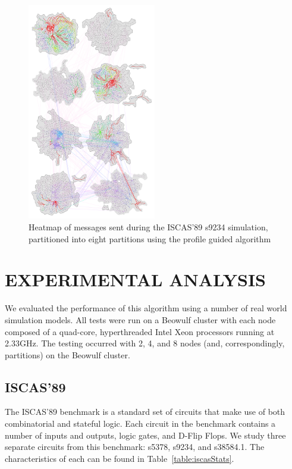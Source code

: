 \documentclass{wscpaperproc}
\begin{document}
\begin{figure}
\centering
\includegraphics[clip=true,width=0.5\textwidth]{figs/s9234_8part}
\caption{Heatmap of messages sent during the ISCAS'89 s9234 simulation, partitioned into
eight partitions using the profile guided algorithm}\label{fig:iscas8part} 
\end{figure}

\section{EXPERIMENTAL ANALYSIS}\label{sec:analysis}

We evaluated the performance of this algorithm using a number of real world simulation models. All tests were run on a Beowulf cluster with each node composed of a quad-core, hyperthreaded Intel Xeon processors running at 2.33GHz.  The testing occurred with 2, 4, and 8 nodes (and, correspondingly, partitions) on the Beowulf cluster.

\subsection{ISCAS’89}

The ISCAS’89 benchmark is a standard set of circuits that make use of both combinatorial and stateful logic. Each circuit in the benchmark contains a number of inputs and outputs, logic gates, and D-Flip Flops. We study three separate circuits from this benchmark: s5378, s9234, and s38584.1. The characteristics of each can be found in Table~\ref{table:iscasStats}.
\end{document}

